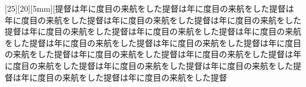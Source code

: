 \documentclass[luatex,fontsize=8pt,paper=b5,twoside,report]{jlreq}%
\begin{document}
[25][20][5mm][提督は年に度目の来航をした提督は年に度目の来航をした提督は年に度目の来航をした提督は年に度目の来航をした提督は年に度目の来航をした提督は年に度目の来航をした提督は年に度目の来航をした提督は年に度目の来航をした提督は年に度目の来航をした提督は年に度目の来航をした提督は年に度目の来航をした提督は年に度目の来航をした提督は年に度目の来航をした提督は年に度目の来航をした提督は年に度目の来航をした提督は年に度目の来航をした提督は年に度目の来航をした提督は年に度目の来航をした提督\Eij
\end{document}
